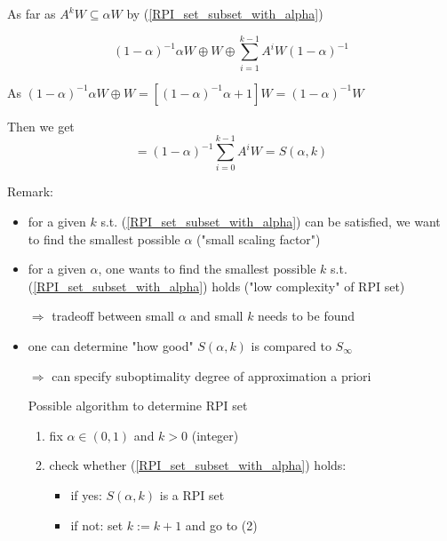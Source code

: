 As far as $A^kW \subseteq \alpha W$ by (\ref{RPI_set_subset_with_alpha})

\begin{equation*}
(1-\alpha)^{-1}\alpha W \oplus W \oplus \sum_{i=1}^{k-1}A^iW(1-\alpha)^{-1}
\end{equation*}

As $(1-\alpha)^{-1}\alpha W \oplus W = [(1-\alpha)^{-1} \alpha + 1]W = (1-\alpha)^{-1}W$

Then we get 
\begin{equation*}
= (1-\alpha)^{-1}\sum_{i=0}^{k-1}A^iW = S(\alpha,k)
\end{equation*}

Remark:
\begin{itemize}
\item for a given $k$ s.t. (\ref{RPI_set_subset_with_alpha}) can be satisfied, we want to find the smallest possible $\alpha$ ("small scaling factor")
\item for a given $\alpha$, one wants to find the smallest possible $k$ s.t. (\ref{RPI_set_subset_with_alpha}) holds ("low complexity" of RPI set)

$\Rightarrow$ tradeoff between small $\alpha$ and small $k$ needs to be found 
\item one can determine "how good" $S(\alpha,k)$ is compared to $S_{\infty}$

$\Rightarrow$ can specify suboptimality degree of approximation a priori

Possible algorithm to determine RPI set
\begin{enumerate}
\item fix $\alpha \in (0,1)$ and $k > 0$ (integer)
\item check whether (\ref{RPI_set_subset_with_alpha}) holds:
\begin{itemize}
\item if yes: $S(\alpha,k)$ is a RPI set
\item if not: set $k := k+1$ and go to (2)
\end{itemize}
\end{enumerate}
\end{itemize}   